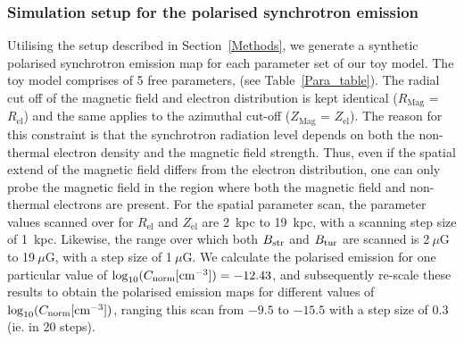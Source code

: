 \documentclass[usenatbib]{mnras}
\begin{document}
\subsubsection{Simulation setup for the polarised synchrotron emission}
Utilising the setup described in Section~\ref{Methods}, we generate a synthetic polarised synchrotron emission map for each parameter set of our toy model. The toy model comprises of 5 free parameters, (see Table~\ref{Para_table}). The radial cut off of the magnetic field and electron distribution is kept identical ($R_{\mathrm{Mag}}$ = $R_{\mathrm{el}}$) and the same applies to the azimuthal cut-off ($Z_{\mathrm{Mag}}$ = $Z_{\mathrm{el}}$). The reason for this constraint is that the synchrotron radiation level depends on both the non-thermal electron density and the magnetic field strength. Thus, even if the spatial extend of the magnetic field differs from the electron distribution, one can only probe the magnetic field in the region where both the magnetic field and non-thermal electrons are present. For the spatial parameter scan, the parameter values scanned over for $R_{\mathrm{el}}$ and $Z_{\mathrm{el}}$ are 2~kpc to 19~kpc, with a scanning step size of 1~kpc. Likewise, the range over which both $B_{\rm str}$ and $B_{\rm tur}$ are scanned is 2$~\mu$G to 19$~\mu$G, with a step size of 1$~\mu$G. We calculate the polarised emission for one particular value of $\log_{10}(C_{\rm norm}[{\rm cm}^{-3}]) = -12.43$, and subsequently re-scale these results to obtain the polarised emission maps for different values of  $\log_{10}(C_{\rm norm} [{\rm cm}^{-3}])$, ranging this scan from $-9.5$ to $-15.5$ with a step size of $0.3$ (ie. in 20 steps).

\end{document}
